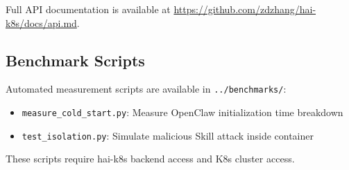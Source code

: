 Full API documentation is available at \url{https://github.com/zdzhang/hai-k8s/docs/api.md}.

\subsection{Benchmark Scripts}

Automated measurement scripts are available in \texttt{../benchmarks/}:

\begin{itemize}
    \item \texttt{measure\_cold\_start.py}: Measure OpenClaw initialization time breakdown
    \item \texttt{test\_isolation.py}: Simulate malicious Skill attack inside container
\end{itemize}

These scripts require hai-k8s backend access and K8s cluster access.
